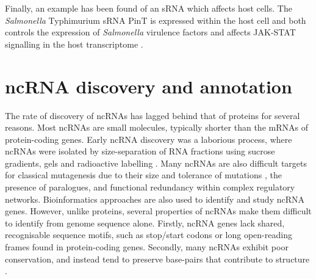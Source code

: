 Finally, an example has been found of an sRNA which affects host cells. The \textit{Salmonella} Typhimurium sRNA PinT is expressed within the host cell and both controls the expression of \textit{Salmonella} virulence factors and affects JAK-STAT signalling in the host transcriptome \citep{Westermann2016-mr}.


\section{ncRNA discovery and annotation}
The rate of discovery of ncRNAs has lagged behind that of proteins for several reasons. Most ncRNAs are small molecules, typically shorter than the mRNAs of protein-coding genes. Early ncRNA discovery was a laborious process, where ncRNAs were isolated by size-separation of RNA fractions using sucrose gradients, gels and radioactive labelling \citep{Andersen1987-tn}. Many ncRNAs are also difficult targets for classical mutagenesis due to their size and tolerance of mutations \citep{Gottesman2004-ke}, the presence of paralogues, and functional redundancy within complex regulatory networks. Bioinformatics approaches are also used to identify and study ncRNA genes. However, unlike proteins, several properties of ncRNAs make them difficult to identify from genome sequence alone. Firstly, ncRNA genes lack shared, recognisable sequence motifs, such as stop/start codons or long open-reading frames found in protein-coding genes. Secondly, many ncRNAs exhibit poor conservation, and instead tend to preserve base-pairs that contribute to structure \citep{Rivas2001-lk}.

